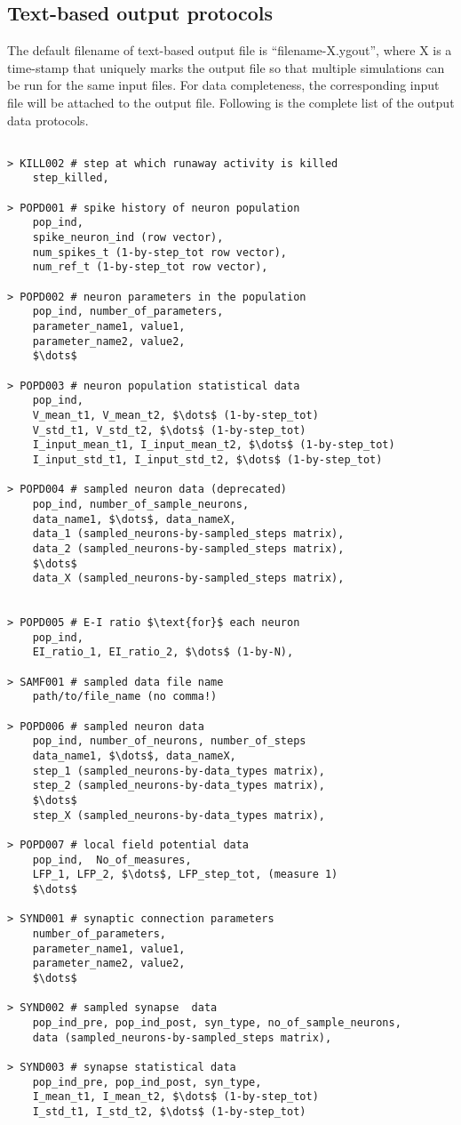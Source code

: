 \documentclass{article}
\begin{document}
\subsection{Text-based output protocols}
The default filename of text-based output file is ``filename-X.ygout'', where X is a time-stamp that uniquely marks the output file so that multiple simulations can be run for the same input files.
For data completeness, the corresponding input file will be attached to the output file.
Following is the complete list of the output data protocols.
\begin{lstlisting}[mathescape]

> KILL002 # step at which runaway activity is killed
	step_killed,

> POPD001 # spike history of neuron population
	pop_ind,
	spike_neuron_ind (row vector),
	num_spikes_t (1-by-step_tot row vector),
	num_ref_t (1-by-step_tot row vector),

> POPD002 # neuron parameters in the population
	pop_ind, number_of_parameters,
	parameter_name1, value1,
	parameter_name2, value2,
	$\dots$

> POPD003 # neuron population statistical data
	pop_ind,
	V_mean_t1, V_mean_t2, $\dots$ (1-by-step_tot)
	V_std_t1, V_std_t2, $\dots$ (1-by-step_tot)
	I_input_mean_t1, I_input_mean_t2, $\dots$ (1-by-step_tot)
	I_input_std_t1, I_input_std_t2, $\dots$ (1-by-step_tot)
	
> POPD004 # sampled neuron data (deprecated)
	pop_ind, number_of_sample_neurons,
	data_name1, $\dots$, data_nameX,
	data_1 (sampled_neurons-by-sampled_steps matrix),
	data_2 (sampled_neurons-by-sampled_steps matrix),
	$\dots$
	data_X (sampled_neurons-by-sampled_steps matrix),


> POPD005 # E-I ratio $\text{for}$ each neuron
	pop_ind,
	EI_ratio_1, EI_ratio_2, $\dots$ (1-by-N),
	
> SAMF001 # sampled data file name
	path/to/file_name (no comma!)

> POPD006 # sampled neuron data
	pop_ind, number_of_neurons, number_of_steps
	data_name1, $\dots$, data_nameX,
	step_1 (sampled_neurons-by-data_types matrix),
	step_2 (sampled_neurons-by-data_types matrix),
	$\dots$
	step_X (sampled_neurons-by-data_types matrix),
	
> POPD007 # local field potential data
	pop_ind,  No_of_measures, 
	LFP_1, LFP_2, $\dots$, LFP_step_tot, (measure 1)
	$\dots$ 
	
> SYND001 # synaptic connection parameters
	number_of_parameters,
	parameter_name1, value1,
	parameter_name2, value2,
	$\dots$

> SYND002 # sampled synapse  data
	pop_ind_pre, pop_ind_post, syn_type, no_of_sample_neurons,
	data (sampled_neurons-by-sampled_steps matrix),

> SYND003 # synapse statistical data
	pop_ind_pre, pop_ind_post, syn_type,
	I_mean_t1, I_mean_t2, $\dots$ (1-by-step_tot)
	I_std_t1, I_std_t2, $\dots$ (1-by-step_tot)
	
	

\end{lstlisting}


{}

\end{document}
